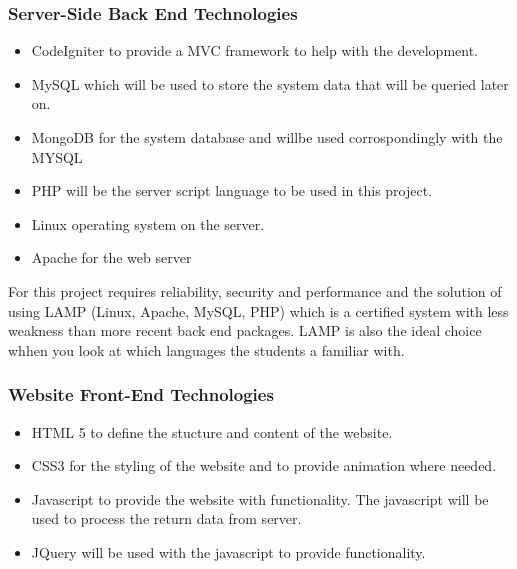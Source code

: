 \documentclass[a4paper,12pt]{report}
\begin{document}
\subsubsection{Server-Side Back End Technologies}
\begin{itemize}
	\item CodeIgniter to provide a MVC framework to help with the development.
	\item MySQL which will be used to store the system data that will be queried later on.
	\item MongoDB for the system database and willbe used corrospondingly with the MYSQL
	\item PHP will be the server script language to be used in this project.
	\item Linux operating system on the server.
	\item Apache for the web server 
\end{itemize}
For this project requires reliability, security and performance and the solution of using LAMP (Linux, Apache, MySQL, PHP) which is a certified system with less weakness than more recent back end packages. LAMP  is also the ideal choice whhen you look at which languages the students a familiar with.
\subsubsection{Website Front-End Technologies}
\begin{itemize}
	\item HTML 5 to define the stucture and content of the website.
	\item CSS3 for the styling of the website and to provide animation where needed.
	\item Javascript to provide the website with functionality. The javascript will be used to process the return data from server.
	\item JQuery will be used with the javascript to provide functionality.
\end{itemize}
\end{document}
